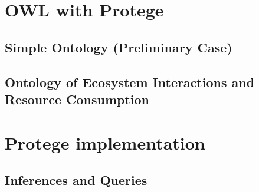 \documentclass[12pt]{article}
\begin{document}
\tableofcontents

\newpage

\section{OWL with Protege}
\subsection{Simple Ontology (Preliminary Case)}


\subsection{Ontology of Ecosystem Interactions and Resource Consumption}


\section{Protege implementation}


\subsection{Inferences and Queries}


\newpage
{}
\printbibliography
\nocite{*}
\end{document}
